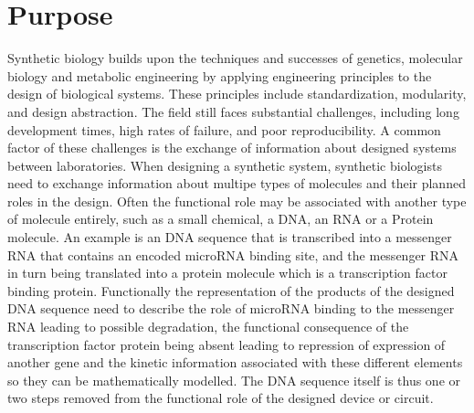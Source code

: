 \section{Purpose}



Synthetic biology builds upon the techniques and successes of genetics, molecular biology and metabolic engineering by applying engineering principles to the design of biological systems. These principles include standardization, modularity, and design abstraction. The field still faces substantial challenges, including long development times, high rates of failure, and poor reproducibility. A common factor of these challenges is the exchange of information about designed systems between laboratories. When designing a synthetic system,  synthetic biologists need to exchange information about multipe types of molecules and their planned roles in the design. Often the functional role may be associated with another type of molecule entirely, such as a small chemical, a DNA, an RNA or a Protein molecule. An example is an DNA sequence that is transcribed into a messenger RNA that contains an encoded microRNA binding site, and the messenger RNA in turn being translated into a protein molecule which is a transcription factor binding protein. Functionally the representation of the products of the designed DNA sequence need to describe the role of microRNA binding to the messenger RNA leading to possible  degradation, the functional consequence of the transcription factor protein being absent leading to repression of expression of another gene and the kinetic information associated with these different elements so they can be mathematically modelled. The DNA sequence itself is thus one or two steps removed from the functional role of the designed device or circuit. 

